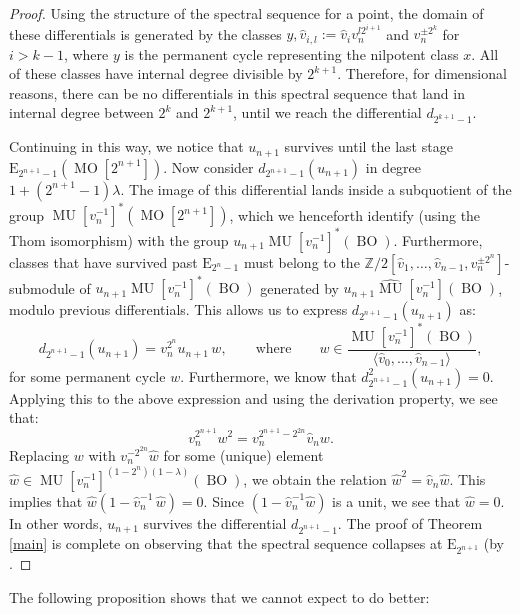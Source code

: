 \documentclass[12pt]{amsart}
\numberwithin{equation}{section}
\theoremstyle{plain}  %
\theoremstyle{definition}  %
\newcommand{\Z}{\mathbb{Z}}
\DeclareMathOperator{\BOg}{BO}
\DeclareMathOperator{\MO}{MO}
\DeclareMathOperator{\MUg}{MU}
\begin{document}
\begin{proof}
 Using the structure of the spectral sequence for a point, the domain of these differentials is generated by the 
classes $ y, \hat{v}_{i,l}:=\hat{v}_iv_n^{l2^{i+1}}$ and $v_n^{\pm 2^k}$ for $i > k-1$, where $y$ is the permanent cycle representing the nilpotent class $x$. All of these classes have internal degree divisible by $2^{k+1}$. 
Therefore, for dimensional reasons, there can be no 
differentials in this spectral sequence that land in internal 
degree between $2^k$ and $2^{k+1}$, until we reach the 
differential $d_{2^{k+1}-1}$. 

\medskip
\noindent
Continuing in this way, we notice that $u_{n+1}$ survives until the last stage $\mbox{E}_{2^{n+1}-1}(\MO[2^{n+1}])$. Now consider $d_{2^{n+1}-1}(u_{n+1})$ in degree $1+(2^{n+1}-1) \lambda$. The image of this differential lands inside a subquotient of the group $\MUg[v_n^{-1}]^*(\MO[2^{n+1}])$, which we henceforth identify (using the Thom isomorphism) with the group $u_{n+1} \MUg[v_n^{-1}]^*(\BOg)$. Furthermore, classes that have survived past $\mbox{E}_{2^n-1}$ must belong to the $\Z/2[\hat{v}_1, \ldots, \hat{v}_{n-1}, v_n^{\pm 2^n}]$-submodule of $u_{n+1} \MUg[v_n^{-1}]^*(\BOg)$ generated by $u_{n+1} \hat{\MUg}[v_n^{-1}](\BOg)$, modulo previous differentials. This allows us to express $d_{2^{n+1}-1}(u_{n+1})$ as: 
\[ d_{2^{n+1}-1}(u_{n+1}) = v_n^{2^n} u_{n+1} \, w, \quad \quad  \text{where} \quad \quad w \in \frac{\MUg[v_n^{-1}]^*(\BOg)}{\langle \hat{v}_0, \ldots, \hat{v}_{n-1} \rangle},  \]
for some permanent cycle $w$. Furthermore, we know that $d_{2^{n+1}-1}^2 (u_{n+1}) = 0$. Applying this to the above expression and using the derivation property, we see that: 
\[ v_n^{2^{n+1}} w^2 = v_n^{2^{n+1}-2^{2n}} \hat{v}_n w. \]
Replacing $w$ with $v_n^{-2^{2n}} \hat{w}$ for some (unique) element $\hat{w} \in \MUg[v_n^{-1}]^{(1-2^n)(1-\lambda)}(\BOg)$, we obtain the relation $\hat{w}^2 = \hat{v}_n \hat{w}$. This implies that $\hat{w} (1- \hat{v}_n^{-1} \, \hat{w}) = 0$. Since $(1-\hat{v}_n^{-1}\hat{w})$ is a unit, we see that $\hat{w} = 0$. In other words, $u_{n+1}$ survives the differential $d_{2^{n+1}-1}$. The proof of Theorem \ref{main} is complete on observing that the 
spectral sequence collapses at $\mbox{E}_{2^{n+1}}$ (by \cite[Theorem 2.1(iv)]{KW14}.
\end{proof}

\medskip
\noindent
The following proposition shows that we cannot expect to do better: 
\end{document}

